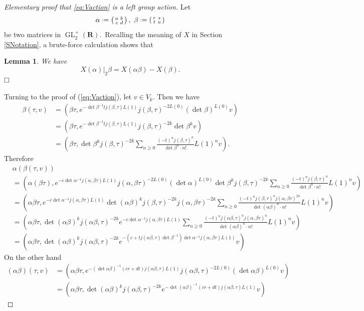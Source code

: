 \documentclass[12pt]{amsart}
\theoremstyle{plain}
\newtheorem{lem}[thm]{Lemma}
\theoremstyle{definition}
\theoremstyle{remark}
\DeclareMathOperator{\GL}{GL}
\newcommand*{\df}{\mathrel{\vcenter{\baselineskip0.5ex \lineskiplimit0pt
                     \hbox{\scriptsize.}\hbox{\scriptsize.}}} =}
\providecommand{\stwomat}[4]{\left(\begin{smallmatrix}#1&#2\\#3&#4\end{smallmatrix}\right)}
\newcommand{\RR}{\mathbf{R}}
\begin{document}
\begin{proof}[Elementary proof that \eqref{eq:Vaction} is a left group action] Let 
\begin{align*}
    \alpha \df\stwomat{a}{b}{c}{d}, \  \beta \df \stwomat{r}{s}{t}{u}
\end{align*} 
be two matrices in $\GL_2^+(\RR)$.\
Recalling the meaning of $X$ in Section \ref{SNotation}, a brute-force calculation shows that
\begin{lem}\label{lemXform}
We have
$$X(\alpha)|_2\beta=X(\alpha\beta)-X(\beta).$$
$\hfill\Box$
\end{lem}

Turning to the proof of (\ref{eq:Vaction}), let $v \in V_k$. Then we have
\begin{align*}
   \beta(\tau,v)&=(\beta\tau, e^{-\det\beta^{-1} tj(\beta, \tau)L(1)}j(\beta,\tau)^{-2L(0)}(\det\beta)^{L(0)}v)\\
   &=(\beta\tau, e^{-\det\beta^{-1}tj(\beta, \tau)L(1)}j(\beta,\tau)^{-2k}\det\beta^{k}v)\\
   &=\left(\beta\tau, \det\beta^kj(\beta, \tau)^{-2k}\sum_{n\geq0} \frac{(-t)^nj(\beta, \tau)^n}{\det\beta^n\cdot n!} L(1)^nv   \right).
\end{align*}
Therefore
\begin{align*}
   & \alpha(\beta(\tau,v))\\
   &=\left(\alpha(\beta\tau), e^{-c\det\alpha^{-1}j(\alpha, \beta\tau)L(1)} j(\alpha, \beta\tau)^{-2L(0)}(\det\alpha)^{L(0)} \det\beta^k j(\beta, \tau)^{-2k}\sum_{n\geq0} \frac{(-t)^nj(\beta, \tau)^n}{\det\beta^n\cdot n!} L(1)^nv \right)\\
   &=\left(\alpha\beta\tau, e^{-c\det\alpha^{-1}j(\alpha, \beta\tau)L(1)} \det(\alpha \beta)^kj(\beta, \tau)^{-2k}j(\alpha, \beta\tau)^{-2k}\sum_{n\geq0} \frac{(-t)^nj(\beta, \tau)^nj(\alpha, \beta\tau)^{2n}}{\det(\alpha \beta)^n\cdot n!} L(1)^nv \right)\\
   &=\left(\alpha\beta\tau, \det(\alpha \beta)^kj(\alpha\beta, \tau)^{-2k}e^{-c\det\alpha^{-1}j(\alpha, \beta\tau)L(1)}\sum_{n\geq0} \frac{(-t)^nj(\alpha\beta, \tau)^nj(\alpha, \beta\tau)^{n}}{\det(\alpha \beta)^n\cdot n!} L(1)^nv \right)\\
   &=\left(\alpha\beta\tau, \det(\alpha \beta)^kj(\alpha\beta, \tau)^{-2k}e^{-(c+tj(\alpha\beta,\tau)\det\beta^{-1})\det\alpha^{-1}j(\alpha, \beta\tau)L(1)}v\right)
\end{align*}
On the other hand
\begin{align*}
  (\alpha\beta)(\tau,v)&= \left(\alpha\beta\tau, e^{-(\det\alpha\beta)^{-1}(cr+dt)j(\alpha \beta, \tau)L(1)} j(\alpha\beta, \tau)^{-2L(0)}(\det\alpha\beta)^{L(0)}v   \right)\\
  &= \left(\alpha\beta\tau,\det(\alpha\beta)^kj(\alpha\beta,\tau)^{-2k} e^{-\det(\alpha\beta)^{-1}(cr+dt)j(\alpha \beta, \tau)L(1)}v   \right)
\end{align*}


\end{proof}
\end{document}
